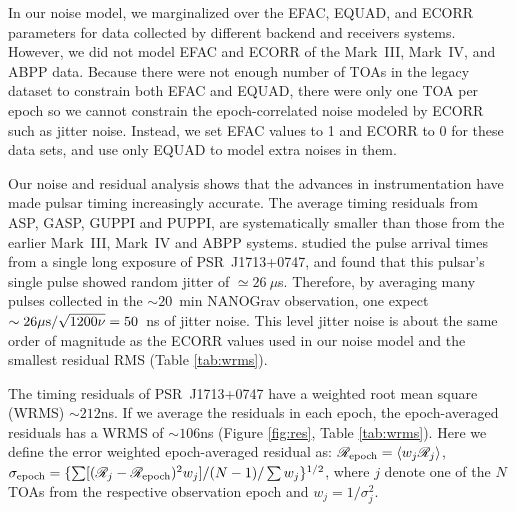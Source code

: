 {In our noise model, we marginalized over the EFAC, EQUAD, and ECORR parameters
for data collected by different backend and receivers systems. However, we did not model 
EFAC and ECORR of the Mark~III, Mark~IV, and ABPP data. Because there were not
enough number of TOAs in the legacy dataset to constrain both EFAC and EQUAD,
there were only one TOA per epoch so we cannot constrain the epoch-correlated
noise modeled by ECORR such as jitter noise. Instead, we set EFAC values to 1
and ECORR to 0 for these data sets, and use only EQUAD to model extra noises
in them.


Our noise and residual analysis shows that the advances in
instrumentation have made pulsar timing increasingly accurate.
The average timing residuals from ASP, GASP, GUPPI and PUPPI, are
systematically smaller than those from the earlier Mark~III, Mark~IV and ABPP
systems.
\citet{sc12} studied the pulse arrival times from a single long exposure of
PSR~J1713+0747, and found that this pulsar's single pulse showed random jitter of
$\simeq26~\mu$s. Therefore, by averaging many pulses collected in the
$\sim20$~min NANOGrav observation, one expect $\sim26\mu{\rm s}/\sqrt{1200\nu}=50$~ns of jitter noise. 
This level jitter noise is about the same order of magnitude as the ECORR values used in our noise model and the smallest residual RMS (Table \ref{tab:wrms}). 


The timing residuals of PSR~J1713+0747 have a weighted root mean square (WRMS)
$\sim 212$ns.
If we average the residuals in each epoch, the epoch-averaged residuals has a 
WRMS of $\sim 106$ns (Figure \ref{fig:res}, Table \ref{tab:wrms}).
Here we define the error weighted epoch-averaged residual as: 
$\mathscr{R}_{\rm epoch} = \langle w_j\mathscr{R}_{j}\rangle$, $\sigma_{\rm
epoch}=\{\sum [(\mathscr{R}_j-\mathscr{R}_{\rm epoch})^2w_j]/(N-1)/\sum w_j\}^{1/2}$, where $j$
denote one of the $N$ TOAs from the respective observation epoch and
$w_j=1/\sigma_j^2$.


}
